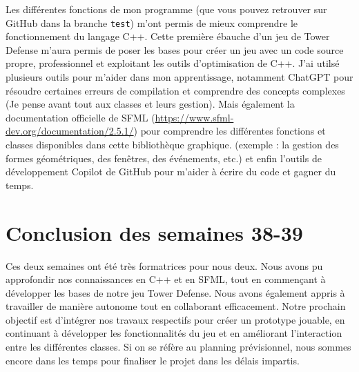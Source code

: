 Les différentes fonctions de mon programme (que vous pouvez retrouver sur GitHub dans la branche \texttt{test}) m’ont permis de mieux comprendre le fonctionnement du langage C++.  
Cette première ébauche d’un jeu de Tower Defense m’aura permis de poser les bases pour créer un jeu avec un code source propre, professionnel et exploitant les outils d’optimisation de C++. J'ai utilsé plusieurs outils pour m'aider dans mon apprentissage, notamment ChatGPT pour résoudre certaines erreurs de compilation et comprendre des concepts complexes (Je pense avant tout aux classes et leurs gestion).
Mais également la documentation officielle de SFML (\url{https://www.sfml-dev.org/documentation/2.5.1/}) pour comprendre les différentes fonctions et classes disponibles dans cette bibliothèque graphique. (exemple : la gestion des formes géométriques, des fenêtres, des événements, etc.) et enfin l'outils de développement Copilot de GitHub pour m'aider à écrire du code et gagner du temps.

\section{Conclusion des semaines 38-39}

Ces deux semaines ont été très formatrices pour nous deux. Nous avons pu approfondir nos connaissances en C++ et en SFML, tout en commençant à développer les bases de notre jeu Tower Defense. Nous avons également appris à travailler de manière autonome tout en collaborant efficacement. Notre prochain objectif est d'intégrer nos travaux respectifs pour créer un prototype jouable, en continuant à développer les fonctionnalités du jeu et en améliorant l'interaction entre les différentes classes. Si on se réfère au planning prévisionnel, nous sommes encore dans les temps pour finaliser le projet dans les délais impartis.